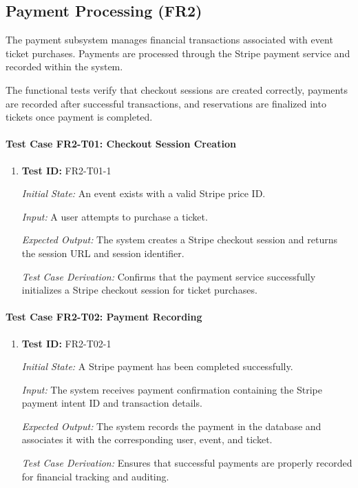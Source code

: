 \documentclass[12pt, titlepage]{article}
\begin{document}
\subsection{Payment Processing (FR2)}

The payment subsystem manages financial transactions associated with event ticket purchases. Payments are processed through the Stripe payment service and recorded within the system.

The functional tests verify that checkout sessions are created correctly, payments are recorded after successful transactions, and reservations are finalized into tickets once payment is completed.


\paragraph{Test Case FR2-T01: Checkout Session Creation}

\begin{enumerate}

\item \textbf{Test ID:} FR2-T01-1

\textit{Initial State:} An event exists with a valid Stripe price ID.

\textit{Input:} A user attempts to purchase a ticket.

\textit{Expected Output:} The system creates a Stripe checkout session and returns the session URL and session identifier.

\textit{Test Case Derivation:} Confirms that the payment service successfully initializes a Stripe checkout session for ticket purchases.

\end{enumerate}


\paragraph{Test Case FR2-T02: Payment Recording}

\begin{enumerate}

\item \textbf{Test ID:} FR2-T02-1

\textit{Initial State:} A Stripe payment has been completed successfully.

\textit{Input:} The system receives payment confirmation containing the Stripe payment intent ID and transaction details.

\textit{Expected Output:} The system records the payment in the database and associates it with the corresponding user, event, and ticket.

\textit{Test Case Derivation:} Ensures that successful payments are properly recorded for financial tracking and auditing.

\end{enumerate}
\end{document}
